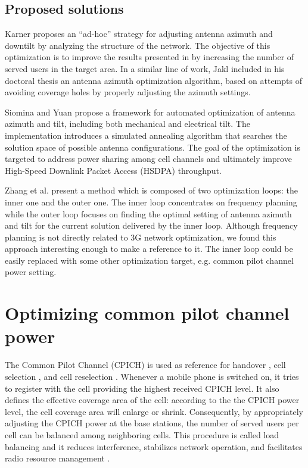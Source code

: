 \subsection{Proposed solutions}

Karner \cite{MSc.antenna.optimization:2003} proposes an ``ad-hoc''
strategy for adjusting antenna azimuth and downtilt by analyzing the
structure of the network. The objective of this optimization is to
improve the results presented in \cite{Antenna.tilt.and.CPICH:2003}
by increasing the number of served users in the target area. In a
similar line of work, Jakl \cite{Jakl:PhD} included in his doctoral
thesis an antenna azimuth optimization algorithm, based on attempts
of avoiding coverage holes by properly adjusting the azimuth settings.

Siomina and Yuan \cite{Antenna.Configuration:2008} propose a framework
for automated optimization of antenna azimuth and tilt, including
both mechanical and electrical tilt. The implementation introduces
a simulated annealing algorithm that searches the solution space of
possible antenna configurations. The goal of the optimization is targeted
to address power sharing among cell channels and ultimately improve
High-Speed Downlink Packet Access (HSDPA) \cite{wiki:hsdpa} throughput.

Zhang et al. \cite{Antenna.azimuth.tilt:2009} present a method which
is composed of two optimization loops: the inner one and the outer
one. The inner loop concentrates on frequency planning while the outer
loop focuses on finding the optimal setting of antenna azimuth and
tilt for the current solution delivered by the inner loop. Although
frequency planning is not directly related to 3G network optimization,
we found this approach interesting enough to make a reference to it.
The inner loop could be easily replaced with some other optimization
target, e.g. common pilot channel power setting.


\section{Optimizing common pilot channel power}

The Common Pilot Channel (CPICH) is used as reference for handover
\cite{umts_world:handover}, cell selection \cite{3glteinfo:cellSelection},
and cell reselection \cite{flore2005:cell_reselection}. Whenever
a mobile phone is switched on, it tries to register with the cell
providing the highest received CPICH level. It also defines the effective
coverage area of the cell: according to the the CPICH power level,
the cell coverage area will enlarge or shrink. Consequently, by appropriately
adjusting the CPICH power at the base stations, the number of served
users per cell can be balanced among neighboring cells. This procedure
is called load balancing and it reduces interference, stabilizes network
operation, and facilitates radio resource management \cite{WCDMAforUMTS_RadioAccessForThirdGenerationMobileCommunications}.


